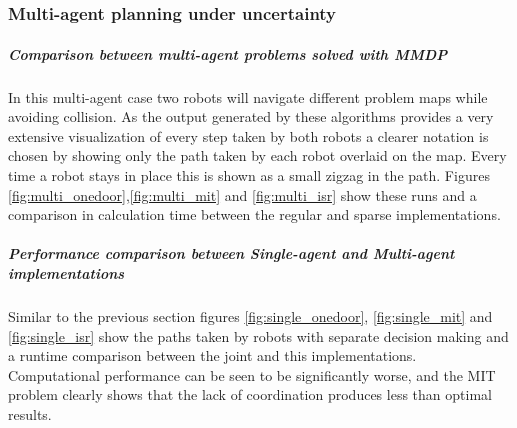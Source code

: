 \documentclass[10pt,a4paper]{article}
\begin{document}
\restoregeometry



\part{}


\section{Multi-agent planning under uncertainty}

\subsubsection*{Comparison between multi-agent problems solved with MMDP}
In this multi-agent case two robots will navigate different problem maps while avoiding collision.
As the output generated by these algorithms provides a very extensive visualization of every step taken by both robots a clearer notation is chosen by showing only the path taken by each robot overlaid on the map.
Every time a robot stays in place this is shown as a small zigzag in the path.
Figures \ref{fig:multi_onedoor},\ref{fig:multi_mit} and \ref{fig:multi_isr} show these runs and a comparison in calculation time between the regular and sparse implementations.

\subsubsection*{Performance comparison between Single-agent and Multi-agent implementations}

Similar to the previous section figures \ref{fig:single_onedoor}, \ref{fig:single_mit} and \ref{fig:single_isr} show the paths taken by robots with separate decision making and a runtime comparison between the joint and this implementations.
Computational performance can be seen to be significantly worse, and the MIT problem clearly shows that the lack of coordination produces less than optimal results.
\end{document}
